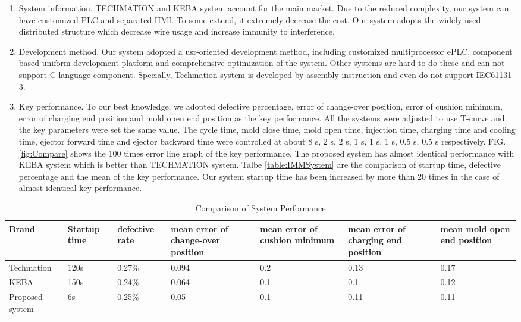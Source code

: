 \documentclass[journal,UTF8]{IEEEtran}
\begin{document}
\begin{enumerate}
	\item System information. TECHMATION and KEBA system account for the main market. Due to the reduced complexity, our system can have customized PLC and separated HMI. To some extend, it extremely decrease the cost. Our system adopts the widely used distributed structure which decrease wire usage and increase immunity to interference.
	\item Development method. Our system adopted a usr-oriented development method, including customized multiprocessor ePLC, component based uniform development platform and comprehensive optimization of the system. Other systems are hard to do these and can not support C language component. Specially, Techmation system is developed by assembly instruction and even do not support IEC61131-3.
	\item Key performance. To our best knowledge, we adopted defective percentage, error of change-over position, error of cushion minimum, error of charging end position and mold open end position as the key performance. All the systems were adjusted to use T-curve and the key parameters were set the same value. The cycle time, mold close time, mold open time, injection time, charging time and cooling time, ejector forward time and ejector backward time were controlled at about 8 s, 2 s, 2 s, 1 s, 1 s, 1 s, 0.5 s, 0.5 s respectively. FIG. \ref{fig:Compare} shows the 100 times error line graph of the key performance. The proposed system has almost identical performance with KEBA system which is better than TECHMATION system. Talbe \ref{table:IMMSystem} are the comparison of startup time, defective percentage and the mean of the key performance. Our system startup time has been increased by more than 20 times in the case of almost identical key performance.
\end{enumerate}
\begin{table}
	\scriptsize \caption{Comparison of System Performance}
	\label{table:ComparisonG}
	\begin{center}
		\renewcommand{\arraystretch}{1.4}
		\setlength\tabcolsep{3pt}
		\begin{tabular}{|p{2cm}|p{1.5cm}|p{1.5cm}|p{2.3cm}|p{2.3cm}|p{2.3cm}|p{2cm}|}
			\hline
			Brand & Startup time &defective rate&mean error of change-over position&mean error of cushion minimum&mean error of charging end position&mean mold open end position\\
			\hline
			Techmation  & 120s  &0.27\% &0.094 & 0.2 & 0.13 & 0.17 \\
			\hline
			KEBA        & 150s  &0.24\% &0.064 & 0.1 & 0.1 & 0.12 \\
			\hline
			Proposed system   & 6s     &0.25\% &0.05 & 0.1 & 0.11 & 0.11\\
			\hline
		\end{tabular}
	\end{center}
\end{table}
\end{document}
